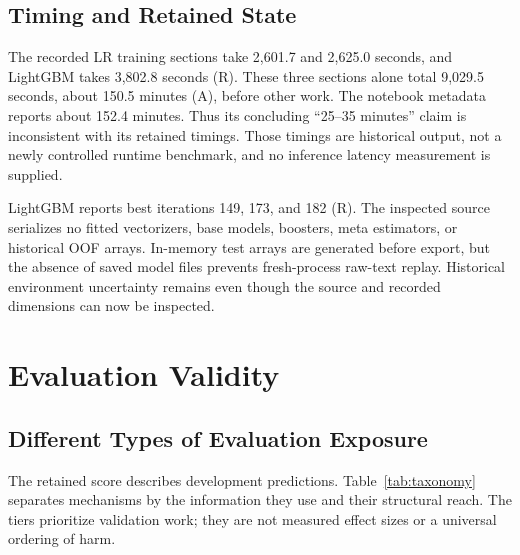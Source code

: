 \documentclass[doublecolumn]{ijcvsplatex}
\begin{document}
\subsection{Timing and Retained State}
The recorded LR training sections take 2,601.7 and 2,625.0 seconds, and LightGBM takes 3,802.8 seconds (R). These three sections alone total 9,029.5 seconds, about 150.5 minutes (A), before other work. The notebook metadata reports about 152.4 minutes. Thus its concluding ``25--35 minutes'' claim is inconsistent with its retained timings. Those timings are historical output, not a newly controlled runtime benchmark, and no inference latency measurement is supplied.

LightGBM reports best iterations 149, 173, and 182 (R). The inspected source serializes no fitted vectorizers, base models, boosters, meta estimators, or historical OOF arrays. In-memory test arrays are generated before export, but the absence of saved model files prevents fresh-process raw-text replay. Historical environment uncertainty remains even though the source and recorded dimensions can now be inspected.

\section{Evaluation Validity}
\label{sec:validity}

\subsection{Different Types of Evaluation Exposure}
The retained score describes development predictions. Table~\ref{tab:taxonomy} separates mechanisms by the information they use and their structural reach. The tiers prioritize validation work; they are not measured effect sizes or a universal ordering of harm.
\end{document}
